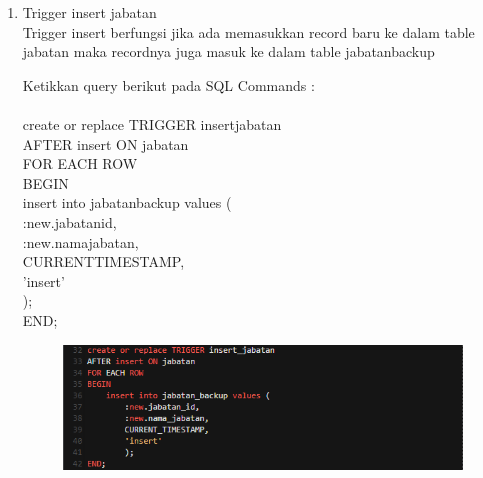 \documentclass[12pt, times new roman, a4paper]{report}
\begin{document}
\begin{enumerate}
\item Trigger insert jabatan\\
Trigger insert berfungsi jika ada memasukkan record baru ke dalam table jabatan maka recordnya juga masuk ke dalam table jabatan\textunderscore backup\\
\par Ketikkan query berikut pada SQL Commands :\\
\\
create or replace TRIGGER insert\textunderscore jabatan\\
AFTER insert ON jabatan\\
FOR EACH ROW\\
BEGIN\\
    insert into jabatan\textunderscore backup values (\\
        :new.jabatan\textunderscore id,\\
        :new.nama\textunderscore jabatan,\\
        CURRENT\textunderscore TIMESTAMP,\\
        'insert'\\
        );\\
END;
\begin{figure}[h]
	\centering
		\includegraphics[scale=0.7]{gambar/17}
\end{figure}

\end{enumerate}
\end{document}
